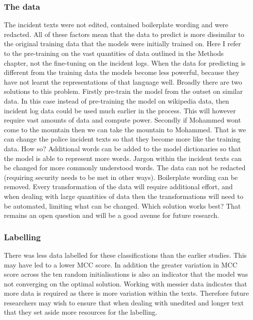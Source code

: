 \subsubsection{The data} The incident texts were not edited, contained boilerplate wording and were redacted. All of these factors mean that the data to predict is more dissimilar to the original training data that the models were initially trained on. Here I refer to the pre-training on the vast quantities of data outlined in the Methods chapter, not the fine-tuning on the incident logs. When the data for predicting is different from the training data the models become less powerful, because they have not learnt the representations of that language well. Broadly there are two solutions to this problem. Firstly pre-train the model from the outset on similar data. In this case instead of pre-training the model on wikipedia data, then incident log data could be used much earlier in the process. This will however require vast amounts of data and compute power. Secondly if Mohammed wont come to the mountain then we can take the mountain to Mohammed.  That is we can change the police incident texts so that they become more like the training data. How so? Additional words can be added to the model dictionaries so that the model is able to represent more words. Jargon within the incident texts can be changed for more commonly understood words. The data can not be redacted (requiring security needs to be met in other ways). Boilerplate wording can be removed.  Every transformation of the data  will require additional effort, and when dealing with large quantities of data then the transformations will need to be automated, limiting what can be changed. Which solution works best? That remains an open question and will be a good avenue for future research.   

\subsubsection{Labelling} There was less data labelled for these classifications than the earlier studies. This may have led to a lower MCC score. In addition the greater variation in MCC score across the ten random initialisations is also an indicator that the model was not converging on the optimal solution. Working with messier data indicates that more data is required as there is more variation within the texts. Therefore future researchers may wish to ensure that when dealing with unedited and longer text that they set aside more resources for the labelling.

